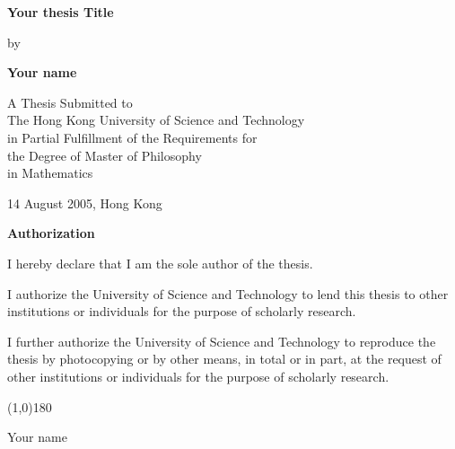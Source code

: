 \documentclass[12pt,a4]{report}
\begin{document}

\null\vspace{0.5in}
\begin{center}
{\Large\bf Your thesis Title}
\vspace{2.5cm}

{\large by}
\vspace{0.5cm}

{\large\bf Your name}\normalsize
\vspace{1cm}

A Thesis Submitted to \\
The Hong Kong University of Science and Technology \\
in Partial Fulfillment of the Requirements for \\
the Degree of Master of Philosophy \\
in Mathematics
\vspace{1.5cm}

14 August 2005, Hong Kong
\end{center}
\thispagestyle{empty}
\newpage

\begin{center}{\Large\bf Authorization}\normalsize
\end{center}
\vspace{0.5cm}

I hereby declare that I am the sole author of the thesis.

\vspace{0.5cm}

I authorize the University of Science and Technology to lend this thesis
to other institutions or individuals for the purpose of scholarly research.

\vspace{0.5cm}

I further authorize the University of Science and Technology to
reproduce the thesis by photocopying or by other means, in total or in
part, at the request of other institutions or individuals for the
purpose of scholarly research.

\vspace{1.5cm}

\begin{center}
\line(1,0){180}
\smallskip

Your name
\end{center}

\newpage
\end{document}
